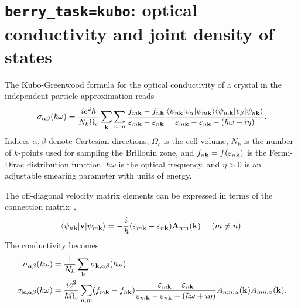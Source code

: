 \section{{\tt berry\_task=kubo}: optical conductivity and joint
  density of states }

The Kubo-Greenwood formula for the optical conductivity of a crystal
in the independent-particle approximation reads
%
\begin{equation}
\sigma_{\alpha\beta}(\hbar\omega)=\frac{ie^2\hbar}{N_k\Omega_c}
\sum_{\bf k}\sum_{n,m}
\frac{f_{m{\bf k}}-f_{n{\bf k}}}
     {\varepsilon_{m{\bf k}}-\varepsilon_{n{\bf k}}}
\frac{\langle\psi_{n{\bf k}}\vert v_\alpha\vert\psi_{m{\bf k}}\rangle
      \langle\psi_{m{\bf k}}\vert v_\beta\vert\psi_{n{\bf k}}\rangle}
{\varepsilon_{m{\bf k}}-\varepsilon_{n{\bf k}}-(\hbar\omega+i\eta)}.
\end{equation}
%
Indices $\alpha,\beta$ denote Cartesian directions, $\Omega_c$ is the
cell volume, $N_k$ is the number of $k$-points used for sampling the
Brillouin zone, and $f_{n{\bf k}}=f(\varepsilon_{n{\bf k}})$ is the
Fermi-Dirac distribution function. $\hbar\omega$ is the optical
frequency, and $\eta>0$ is an adjustable smearing parameter with units
of energy.

The off-diagonal velocity matrix elements can be expressed in terms of
the connection matrix~\cite{blount-ssp62},
%
\begin{equation}
\label{eq:velocity_mat}
\langle\psi_{n{\bf k}}\vert {\bf v} \vert\psi_{m{\bf k}}\rangle=
-\frac{i}{\hbar}(\varepsilon_{m{\bf k}}-\varepsilon_{n{\bf k}})
{\bf A}_{nm}({\bf k})\,\,\,\,\,\,\,\,(m\not= n).
\end{equation}
%
The conductivity becomes
%
\begin{align}
\label{eq:sig-bz}
\sigma_{\alpha\beta}(\hbar\omega)&=
\frac{1}{N_k}\sum_{\bf k}\sigma_{{\bf k},\alpha\beta}(\hbar\omega)\\
\label{eq:sig-k}
\sigma_{{\bf k},\alpha\beta}(\hbar\omega)&=\frac{ie^2}{\hbar\Omega_c}\sum_{n,m}
(f_{m{\bf k}}-f_{n{\bf k}})
\frac{\varepsilon_{m{\bf k}}-\varepsilon_{n{\bf k}}}
{\varepsilon_{m{\bf k}}-\varepsilon_{n{\bf k}}-(\hbar\omega+i\eta)}
A_{nm,\alpha}({\bf k})A_{mn,\beta}({\bf k}).
\end{align}

